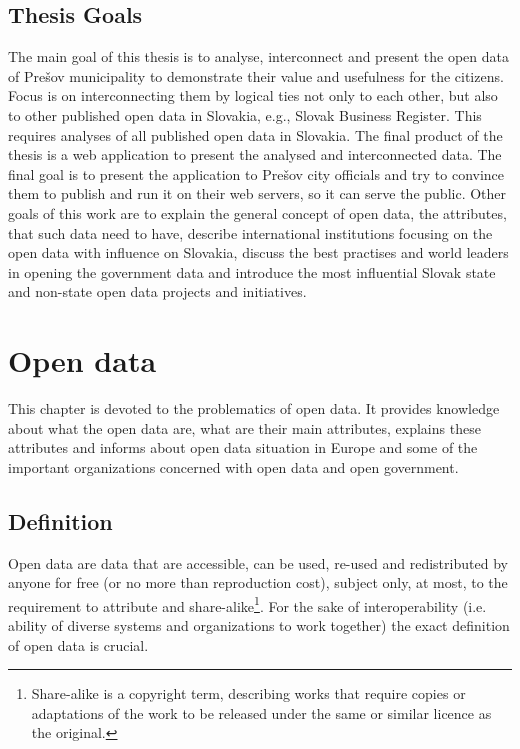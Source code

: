 \documentclass[thesis=B,english]{FITthesis}[2012/06/26]
\begin{document}
\begin{introduction}
	\section*{Thesis Goals}
	The main goal of this thesis is to analyse, interconnect and present the open data of Prešov municipality to demonstrate their value and usefulness for the citizens. Focus is on interconnecting them by logical ties not only to each other, but also to other published open data in Slovakia, e.g., Slovak Business Register. This requires analyses of all published open data in Slovakia. The final product of the thesis is a web application to present the analysed and interconnected data. The final goal is to present the application to Prešov city officials and try to convince them to publish and run it on their web servers, so it can serve the public. Other goals of this work are to explain the general concept of open data, the attributes, that such data need to have, describe international institutions focusing on the open data with influence on Slovakia, discuss the best practises and world leaders in opening the government data and introduce the most influential Slovak state and non-state open data projects and initiatives.

\end{introduction}

\chapter{Open data}
	This chapter is devoted to the problematics of open data. It provides knowledge about what the open data are, what are their main attributes, explains these attributes and informs about open data situation in Europe and some of the important organizations concerned with open data and open government.
	\section{Definition}
	Open data are data that are accessible, can be used, re-used and redistributed by anyone for free (or no more than reproduction cost), subject only, at most, to the requirement to attribute and share-alike\footnote{Share-alike is a copyright term, describing works that require copies or adaptations of the work to be released under the same or similar licence as the original.}. For the sake of interoperability (i.e. ability of diverse systems and organizations to work together) the exact definition of open data is crucial. \cite{opendatahandbook} 
\end{document}
